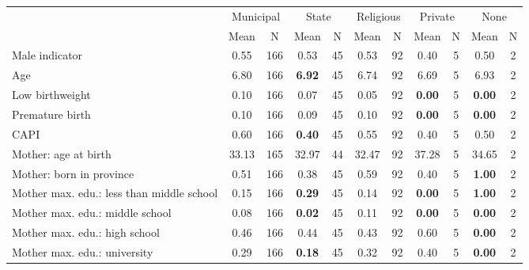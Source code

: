 \begin{tabular}{l c c c c c c c c c c}
\toprule
& \multicolumn{2}{c}{Municipal} & \multicolumn{2}{c}{State} & \multicolumn{2}{c}{Religious} & \multicolumn{2}{c}{Private} & \multicolumn{2}{c}{None} \\
& \scriptsize Mean & \scriptsize N & \scriptsize Mean & \scriptsize N & \scriptsize Mean & \scriptsize N & \scriptsize Mean & \scriptsize N & \scriptsize Mean & \scriptsize N \\
\midrule
Male indicator &      0.55 &       166 &      0.53 &        45 &      0.53 &        92 &      0.40 &         5 &      0.50 &         2 \\
Age &      6.80 &       166 & \textbf{     6.92} &        45 &      6.74 &        92 &      6.69 &         5 &      6.93 &         2 \\
Low birthweight &      0.10 &       166 &      0.07 &        45 &      0.05 &        92 & \textbf{     0.00} &         5 & \textbf{     0.00} &         2 \\
Premature birth &      0.10 &       166 &      0.09 &        45 &      0.10 &        92 & \textbf{     0.00} &         5 & \textbf{     0.00} &         2 \\
CAPI &      0.60 &       166 & \textbf{     0.40} &        45 &      0.55 &        92 &      0.40 &         5 &      0.50 &         2 \\
Mother: age at birth &     33.13 &       165 &     32.97 &        44 &     32.47 &        92 &     37.28 &         5 &     34.65 &         2 \\
Mother: born in province &      0.51 &       166 &      0.38 &        45 &      0.59 &        92 &      0.40 &         5 & \textbf{     1.00} &         2 \\
Mother max. edu.: less than middle school &      0.15 &       166 & \textbf{     0.29} &        45 &      0.14 &        92 & \textbf{     0.00} &         5 & \textbf{     1.00} &         2 \\
Mother max. edu.: middle school &      0.08 &       166 & \textbf{     0.02} &        45 &      0.11 &        92 & \textbf{     0.00} &         5 & \textbf{     0.00} &         2 \\
Mother max. edu.: high school &      0.46 &       166 &      0.44 &        45 &      0.43 &        92 &      0.60 &         5 & \textbf{     0.00} &         2 \\
Mother max. edu.: university &      0.29 &       166 & \textbf{     0.18} &        45 &      0.32 &        92 &      0.40 &         5 & \textbf{     0.00} &         2 \\

\end{tabular}
